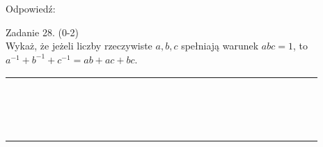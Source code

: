 \documentclass[10pt]{article}
\begin{document}
Odpowiedź: \(\qquad\)

Zadanie 28. (0-2)\\
Wykaż, że jeżeli liczby rzeczywiste \(a, b, c\) spełniają warunek \(a b c=1\), to\\
\(a^{-1}+b^{-1}+c^{-1}=a b+a c+b c\).

\begin{center}
\begin{tabular}{|c|c|c|c|c|c|c|c|c|c|c|c|c|c|c|c|c|c|c|c|c|c|c|c|c|c|c|c|}
\hline
 &  &  &  &  &  &  &  &  &  &  &  &  &  &  &  &  &  &  &  &  &  &  &  &  &  &  &  \\
\hline
 &  &  &  &  &  &  &  &  &  &  &  &  &  &  &  &  &  &  &  &  &  &  &  &  &  &  &  \\
\hline
 &  &  &  &  &  &  &  &  &  &  &  &  &  &  &  &  &  &  &  &  &  &  &  &  &  &  &  \\
\hline
 &  &  &  &  &  &  &  &  &  &  &  &  &  &  &  &  &  &  &  &  &  &  &  &  &  &  &  \\
\hline
 &  &  &  &  &  &  &  &  &  &  &  &  &  &  &  &  &  &  &  &  &  &  &  &  &  &  &  \\
\hline
 &  &  &  &  &  &  &  &  &  &  &  &  &  &  &  &  &  &  &  &  &  &  &  &  &  &  &  \\
\hline
 &  &  &  &  &  &  &  &  &  &  &  &  &  &  &  &  &  &  &  &  &  &  &  &  &  &  &  \\
\hline
 &  &  &  &  &  &  &  &  &  &  &  &  &  &  &  &  &  &  &  &  &  &  &  &  &  &  &  \\
\hline
 &  &  &  &  &  &  &  &  &  &  &  &  &  &  &  &  &  &  &  &  &  &  &  &  &  &  &  \\
\hline
 &  &  &  &  &  &  &  &  &  &  &  &  &  &  &  &  &  &  &  &  &  &  &  &  &  &  &  \\
\hline
 &  &  &  &  &  &  &  &  &  &  &  &  &  &  &  &  &  &  &  &  &  &  &  &  &  &  &  \\
\hline
 &  &  &  &  &  &  &  &  &  &  &  &  &  &  &  &  &  &  &  &  &  &  &  &  &  &  &  \\
\hline
 &  &  &  &  &  &  &  &  &  &  &  &  &  &  &  &  &  &  &  &  &  &  &  &  &  &  &  \\
\hline
 &  &  &  &  &  &  &  &  &  &  &  &  &  &  &  &  &  &  &  &  &  &  &  &  &  &  &  \\
\hline
 &  &  &  &  &  &  &  &  &  &  &  &  &  &  &  &  &  &  &  &  &  &  &  &  &  &  &  \\
\hline
 &  &  &  &  &  &  &  &  &  &  &  &  &  &  &  &  &  &  &  &  &  &  &  &  &  &  &  \\

\end{tabular}
\end{center}
\end{document}
